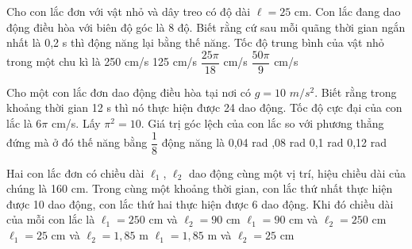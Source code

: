 \begin{ex}%

Cho con lắc đơn với vật nhỏ và dây treo có độ dài $\ell=25$ cm. Con lắc đang dao động điều hòa với biên độ góc là 8 độ. Biết rằng cứ sau mỗi quãng thời gian ngắn nhất là 0,2 s thì động năng lại bằng thế năng. Tốc độ trung bình của vật nhỏ trong một chu kì là
\choice
{250 cm/s}
{125 cm/s}
{$\dfrac{25\pi}{18}$ cm/s}
{\True $\dfrac{50\pi}{9}$ cm/s}
\end{ex} 
\begin{ex}%

Cho một con lắc đơn dao động điều hòa tại nơi có $g = 10$ $m/s^2$. Biết rằng trong khoảng thời gian 12 s thì nó thực hiện được 24 dao động. Tốc độ cực đại của con lắc là $6\pi$ cm/s. Lấy $\pi^2 = 10$. Giá trị góc lệch của con lắc so với phương thẳng đứng mà ở đó thế năng bằng $\dfrac{1}{8}$ động năng là
\choice
{0,04 rad}
{,08 rad}
{0,1 rad}
{0,12 rad}
\end{ex} 
\begin{ex}%
Hai con lắc đơn có chiều dài $\ell_1$, $\ell_2$ dao động cùng một vị trí, hiệu chiều dài của chúng là 160 cm. Trong cùng một khoảng thời gian, con lắc thứ nhất thực hiện được 10 dao động, con lắc thứ hai thực hiện được 6 dao động. Khi đó chiều dài của mỗi con lắc là
\choice
{$\ell_1 = 250$ cm và $\ell_2 = 90$ cm}
{\True $\ell_1 = 90$ cm và $\ell_2 = 250$ cm}
{$\ell_1 = 25$ cm và $\ell_2 = 1,85$ m}
{$\ell_1 = 1,85$ m và $\ell_2 = 25$ cm}
\end{ex} 
